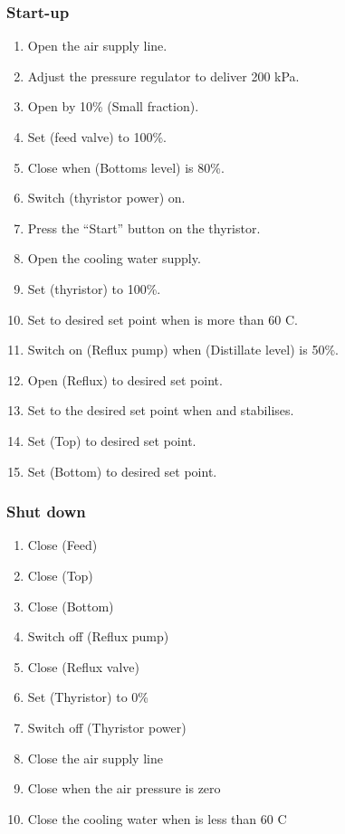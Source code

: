 \subsubsection{Start-up}
\begin{enumerate}
	\item Open the air supply line.
	\item Adjust the pressure regulator to deliver 200 kPa.
	\item Open  by 10\% (Small fraction).
	\item Set  (feed valve) to 100\%.
	\item Close  when  (Bottoms level) is 80\%.
	\item Switch  (thyristor power) on.
	\item Press the ``Start'' button on the thyristor.
	\item Open the cooling water supply.
	\item Set  (thyristor) to 100\%.
	\item Set  to desired set point when  is more than 60 \deg C.
	\item Switch  on (Reflux pump) when  (Distillate level) is 50\%.
	\item Open  (Reflux) to desired set point.
	\item Set  to the desired set point when  and  stabilises.
	\item Set  (Top) to desired set point.
	\item Set  (Bottom) to desired set point.
\end{enumerate}

\subsubsection{Shut down}
\begin{enumerate}
	\item Close  (Feed)
	\item Close  (Top)
	\item Close  (Bottom)
	\item Switch  off (Reflux pump)
	\item Close  (Reflux valve)
	\item Set  (Thyristor) to 0\%
	\item Switch  off (Thyristor power)
	\item Close the air supply line
	\item Close  when the air pressure is zero
	\item Close the cooling water when  is less than 60 \deg C
\end{enumerate}
